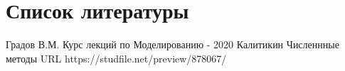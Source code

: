 \documentclass[12pt,a4paper]{scrartcl}
\begin{document}
	\section*{Список литературы}
	\begin{thebibliography}{3}
			Градов В.М. Курс лекций по Моделированию - 2020
			Калитикин Численнные методы URL https://studfile.net/preview/878067/
		
	\end{thebibliography}
	
\end{document}
